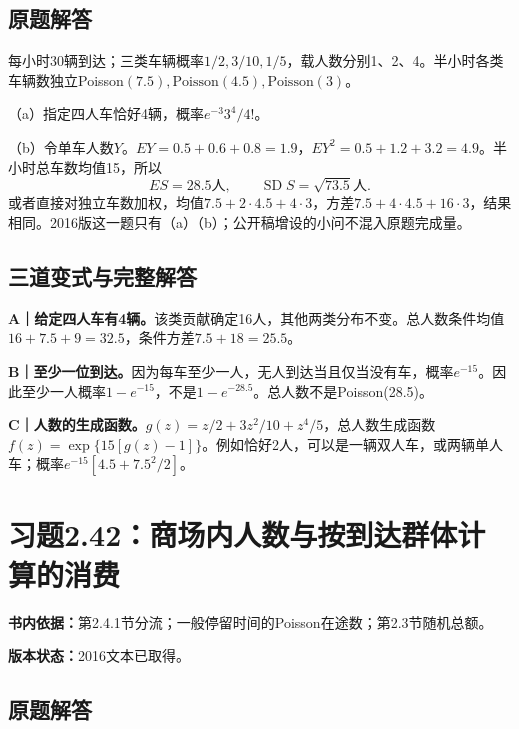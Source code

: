 \documentclass[
  11pt,
  a4paper,
  UTF8,fontset=fandol]{ctexart}
\let\OldSection\section
\renewcommand{\section}{\Needspace{7\baselineskip}\OldSection}
\let\OldSubsection\subsection
\renewcommand{\subsection}{\Needspace{5\baselineskip}\OldSubsection}
\begin{document}
\subsection{原题解答}\label{ux539fux9898ux89e3ux7b54-40}

每小时30辆到达；三类车辆概率\(1/2,3/10,1/5\)，载人数分别1、2、4。半小时各类车辆数独立Poisson\((7.5),\mathrm{Poisson}(4.5),\mathrm{Poisson}(3)\)。

（a）指定四人车恰好4辆，概率\(\boxed{e^{-3}3^4/4!}\)。

（b）令单车人数\(Y\)。\(EY=0.5+0.6+0.8=1.9\)，\(EY^2=0.5+1.2+3.2=4.9\)。半小时总车数均值15，所以
\[\boxed{ES=28.5\text{人},\qquad\operatorname{SD}S=\sqrt{73.5}\text{人}.}\]
或者直接对独立车数加权，均值\(7.5+2\cdot4.5+4\cdot3\)，方差\(7.5+4\cdot4.5+16\cdot3\)，结果相同。2016版这一题只有（a）（b）；公开稿增设的小问不混入原题完成量。

\subsection{三道变式与完整解答}\label{ux4e09ux9053ux53d8ux5f0fux4e0eux5b8cux6574ux89e3ux7b54-40}

\textbf{A｜给定四人车有4辆。}该类贡献确定16人，其他两类分布不变。总人数条件均值\(16+7.5+9=32.5\)，条件方差\(7.5+18=25.5\)。

\textbf{B｜至少一位到达。}因为每车至少一人，无人到达当且仅当没有车，概率\(e^{-15}\)。因此至少一人概率\(1-e^{-15}\)，不是\(1-e^{-28.5}\)。总人数不是Poisson(28.5)。

\textbf{C｜人数的生成函数。}\(g(z)=z/2+3z^2/10+z^4/5\)，总人数生成函数\(f(z)=\exp\{15[g(z)-1]\}\)。例如恰好2人，可以是一辆双人车，或两辆单人车；概率\(e^{-15}[4.5+7.5^2/2]\)。

\newpage

\section{习题2.42：商场内人数与按到达群体计算的消费}\label{ux4e60ux98982.42ux5546ux573aux5185ux4ebaux6570ux4e0eux6309ux5230ux8fbeux7fa4ux4f53ux8ba1ux7b97ux7684ux6d88ux8d39}

\textbf{书内依据：}第2.4.1节分流；一般停留时间的Poisson在途数；第2.3节随机总额。

\textbf{版本状态：}2016文本已取得。

\subsection{原题解答}\label{ux539fux9898ux89e3ux7b54-41}
\end{document}
